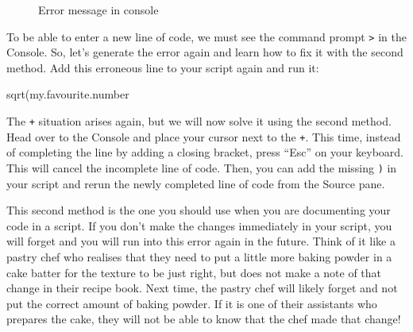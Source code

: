 \documentclass[
  letterpaper,
  DIV=11,
  numbers=noendperiod]{scrreprt}
\newenvironment{Shaded}{\begin{snugshade}}{\end{snugshade}}
\newcommand{\FunctionTok}[1]{\textcolor[rgb]{0.28,0.35,0.67}{#1}}
\newcommand{\NormalTok}[1]{\textcolor[rgb]{0.00,0.23,0.31}{#1}}
\begin{document}
\begin{figure}


\caption{\label{fig-ConsoleError}Error message in console}

\end{figure}%

To be able to enter a new line of code, we must see the command prompt
\texttt{\textgreater{}} in the Console. So, let's generate the error
again and learn how to fix it with the second method. Add this erroneous
line to your script again and run it:

\begin{Shaded}
\begin{Highlighting}[]
\FunctionTok{sqrt}\NormalTok{(my.favourite.number}
\end{Highlighting}
\end{Shaded}

The \texttt{+} situation arises again, but we will now solve it using
the second method. Head over to the Console and place your cursor next
to the \texttt{+}. This time, instead of completing the line by adding a
closing bracket, press ``Esc'' on your keyboard. This will cancel the
incomplete line of code. Then, you can add the missing \texttt{)} in
your script and rerun the newly completed line of code from the Source
pane.

This second method is the one you should use when you are documenting
your code in a script. If you don't make the changes immediately in your
script, you will forget and you will run into this error again in the
future. Think of it like a pastry chef who realises that they need to
put a little more baking powder in a cake batter for the texture to be
just right, but does not make a note of that change in their recipe
book. Next time, the pastry chef will likely forget and not put the
correct amount of baking powder. If it is one of their assistants who
prepares the cake, they will not be able to know that the chef made that
change!
\end{document}
